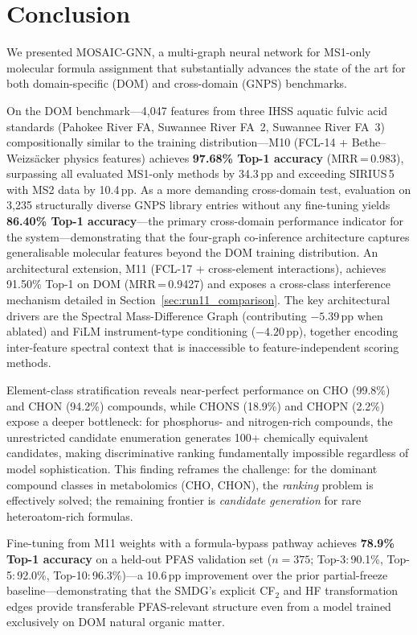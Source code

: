 \documentclass[journal=jcisd8]{achemso}
\begin{document}
\section{Conclusion}
\label{sec:conclusion}

We presented MOSAIC-GNN, a multi-graph neural network for MS1-only molecular formula
assignment that substantially advances the state of the art for both domain-specific
(DOM) and cross-domain (GNPS) benchmarks.

On the DOM benchmark---4,047 features from three IHSS aquatic fulvic acid standards
(Pahokee River FA, Suwannee River FA~2, Suwannee River FA~3) compositionally
similar to the training distribution---M10 (FCL-14 + Bethe--Weizs{\"a}cker physics
features) achieves \textbf{97.68\% Top-1 accuracy} (MRR\,=\,0.983), surpassing all
evaluated MS1-only methods by 34.3\,pp and exceeding SIRIUS\,5 with MS2 data by 10.4\,pp.
As a more demanding cross-domain test, evaluation on 3,235 structurally diverse
GNPS library entries without any fine-tuning yields \textbf{86.40\% Top-1 accuracy}---the
primary cross-domain performance indicator for the system---demonstrating that the
four-graph co-inference architecture captures generalisable molecular features beyond
the DOM training distribution.
An architectural extension, M11 (FCL-17 + cross-element interactions), achieves
91.50\% Top-1 on DOM (MRR\,=\,0.9427) and exposes a cross-class interference mechanism
detailed in Section~\ref{sec:run11_comparison}.
The key architectural drivers are the Spectral Mass-Difference Graph (contributing $-5.39$\,pp
when ablated) and FiLM instrument-type conditioning ($-4.20$\,pp), together encoding
inter-feature spectral context that is inaccessible to feature-independent scoring methods.

Element-class stratification
reveals near-perfect performance on CHO (99.8\%) and CHON (94.2\%) compounds, while
CHONS (18.9\%) and CHOPN (2.2\%) expose a deeper bottleneck: for phosphorus- and nitrogen-rich
compounds, the unrestricted candidate enumeration generates 100+ chemically equivalent
candidates, making discriminative ranking fundamentally impossible regardless of model
sophistication.  This finding reframes the challenge: for the dominant compound classes
in metabolomics (CHO, CHON), the \emph{ranking} problem is effectively solved;
the remaining frontier is \emph{candidate generation} for rare heteroatom-rich formulas.

Fine-tuning from M11 weights with a formula-bypass pathway achieves
\textbf{78.9\% Top-1 accuracy} on a held-out PFAS validation set
($n=375$; Top-3:\,90.1\%, Top-5:\,92.0\%, Top-10:\,96.3\%)---a 10.6\,pp
improvement over the prior partial-freeze baseline---demonstrating that the SMDG's
explicit CF$_2$ and HF transformation edges provide transferable PFAS-relevant
structure even from a model trained exclusively on DOM natural organic matter.
\end{document}
